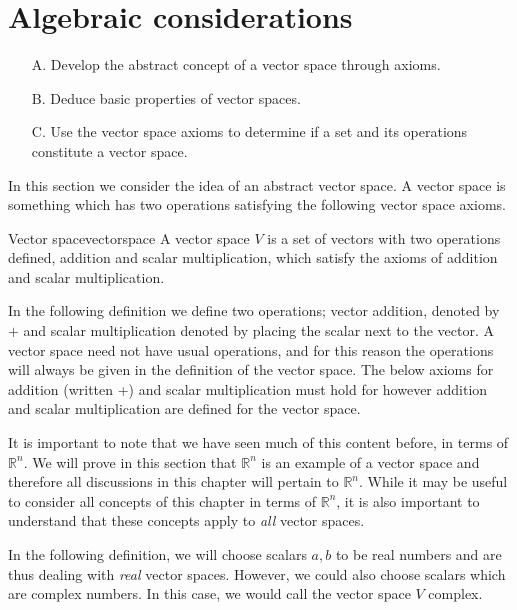 \section{Algebraic considerations}

\begin{outcome}
\begin{enumerate}
\item[A.] Develop the abstract concept of a vector space through axioms.

\item[B.] Deduce basic properties of vector spaces.

\item[C.]  Use the vector space axioms to determine if a set and its operations constitute a vector space.
\end{enumerate}
\end{outcome}

In this section we consider the idea of an abstract vector space. A vector space is
something which has two operations satisfying the following vector space
axioms.

\begin{definition}{Vector space}{vectorspace}
A vector space $V$ is a set of vectors with two operations defined, addition and scalar multiplication, which satisfy the axioms of addition and scalar multiplication. 
\end{definition}

In the following definition we define two operations; vector addition, denoted by $+$ and scalar
multiplication denoted by placing the scalar next to the vector. A vector space need not have usual operations, and for this reason the operations will always be given in the definition of the vector space. The below axioms for addition (written +) and scalar multiplication must hold for however addition and scalar multiplication are defined for the vector space.  

It is important to note that we have seen much of this content before, in terms of $\mathbb{R}^n$. We will prove in this section that $\mathbb{R}^n$ is an example of a vector space and therefore all discussions in this chapter will pertain to $\mathbb{R}^n$. While it may be useful to consider all concepts of this chapter in terms of $\mathbb{R}^n$, it is also important to understand that these concepts apply to \textit{all} vector spaces. 

In the following definition, we will choose scalars $a,b$ to be real numbers and are thus dealing with \textit{real} vector spaces. However, we could also choose scalars which are complex numbers. In this case, we would call the vector space $V$ complex. 

